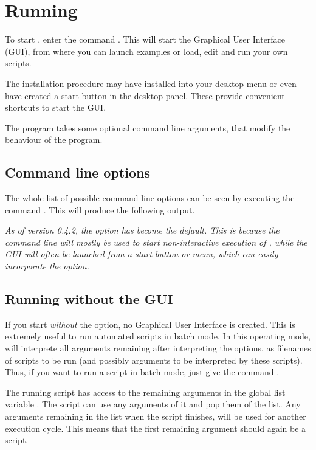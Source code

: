 \section{Running \pyf}
\label{sec:running}
To start \pyf, enter the command . This will start the \pyf Graphical User Interface (GUI), from where you can launch examples or load, edit and run your own \pyf scripts.

The installation procedure may have installed \pyf into your desktop menu or even have created a start button in the desktop panel. These provide convenient shortcuts to start the \pyf GUI.

The \pyf program takes some optional command line arguments, that modify the behaviour of the program.

\subsection{Command line options}
The whole list of possible command line options can be seen by executing the command . This will produce the following output.


\emph{As of version 0.4.2, the option has become the default. This is because the command line will mostly be used to start non-interactive execution of \pyf, while the GUI will often be launched from a start button or menu, which can easily incorporate the  option. 
}
\subsection{Running \pyFormex without the GUI}
If you start \pyf \emph{without} the  option, no Graphical User Interface is created. This is extremely useful to run automated scripts in batch mode. In this operating mode, \pyf will interprete all arguments remaining after interpreting the options, as filenames of scripts to be run (and possibly arguments to be interpreted by these scripts).
Thus, if you want to run a \pyf script  in batch mode, just give the command .

The running script has access to the remaining arguments in the global list variable . The script can use any arguments of it and pop them of the list. Any arguments remaining in the  list when the script finishes, will be used for another \pyf execution cycle. This means that the first remaining argument should again be a \pyf script.
 

